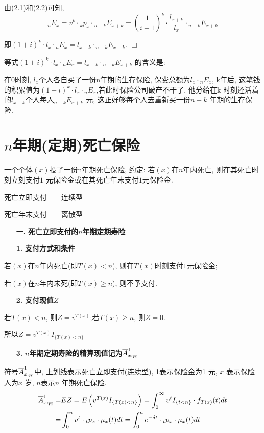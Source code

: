 \documentclass[a4paper,10pt]{ctexbook}
\makeatletter
\newcommand{\hei}{\CJKfamily{hei}}      %
\def\qed{\hfill$\Box$\medskip}
\DeclareRobustCommand{\annu}[1]{_{%
    \def\arraystretch{0}%
    \setlength\arraycolsep{1pt}%
    \setlength\arrayrulewidth{.2pt}%
    \begin{array}[b]{@{}c|}\hline
        \\[\arraycolsep]%
        \scriptstyle #1%
    \end{array}%
}}
\makeatother
\begin{document}
由(2.1)和(2.2)可知,
$$_nE_x=v^k\cdot {}_kp_x\cdot {}_{n-k}E_{x+k}=(\frac{1}{i+1})^k\cdot\frac{l_{x+k}}{l_x}\cdot {}_{n-k}E_{x+k}$$

即$(1+i)^k\cdot l_x\cdot {}_nE_x=l_{x+k}\cdot {}_{n-k}E_{x+k}$.
\qed


\begin{remark}
    等式$(1+i)^k\cdot l_x\cdot {}_nE_x=l_{x+k}\cdot {}_{n-k}E_{x+k}$ 的含义是:

    在0时刻, $l_x$个人各自买了一份n年期的生存保险, 保费总额为$l_x\cdot {}_nE_x$, k年后, 这笔钱的积累值为$(1+i)^k\cdot l_x\cdot {}_nE_x$,若此时保险公司破产不干了, 他分给在k 时刻还活着的$l_{x+k}$个人每人$_{n-k}E_{x+k}$ 元, 这正好够每个人去重新买一份$n-k$ 年期的生存保险.
\end{remark}
\section{$n$年期(定期)死亡保险}

一个个体$(x)$投了一份n年期死亡保险, 约定: 若$(x)$在$n$年内死亡, 则在其死亡时刻立刻支付$1$ 元保险金或在其死亡年末支付$1$元保险金.

死亡立即支付——连续型

死亡年末支付——离散型
\begin{itemize}
    \item[{\bf\hei 一.}]{\bf\hei 死亡立即支付的$n$年期定期寿险}
\end{itemize}
\begin{itemize}
    \item[{\bf\hei 1.}]{\bf\hei 支付方式和条件}
\end{itemize}

若$(x)$在$n$年内死亡(即$T(x)<n$), 则在$T(x)$时刻支付$1$元保险金;

若$(x)$在$n$年内未死(即$T(x)\geqslant n$), 则不予支付.
\begin{itemize}
    \item[{\bf\hei 2.}]{\bf\hei 支付现值$Z$}
\end{itemize}

若$T(x)<n$, 则$Z=v^{T(x)}$;若$T(x)\geqslant n$, 则$Z=0$.

所以$Z=v^{T(x)}I_{\{T(x)<n\}}$
\begin{itemize}
    \item[{\bf\hei 3.}]{\bf\hei $n$年期定期寿险的精算现值记为$\overline{A}_{x:\annu{n}}^1$}
\end{itemize}
\begin{remark}
    符号$\overline{A}_{x:\annu{n}}^1$中, 上划线表示死亡立即支付(连续型), 1表示保险金为1 元, $x$ 表示保险人为$x$ 岁, $n$表示$n$ 年期死亡保险.
    \begin{align*}
        \overline{A}_{x:\annu{n}}^1= & EZ=E\left( v^{T\left( x \right)}I_{\left\{ T\left( x \right) <n \right\}} \right) =\int_0^{\infty}{v^{t}I_{\left\{ t <n \right\}}\cdot f_{T(x)}(t)dt} \\
        =                            & \int_0^{n}{v^{t}\cdot {}_tp_x\cdot \mu_{x}(t)dt}=\int_0^{n}{e^{-\delta t}\cdot {}_tp_x\cdot \mu_{x}(t)dt}
    \end{align*}
\end{remark}
\end{document}
